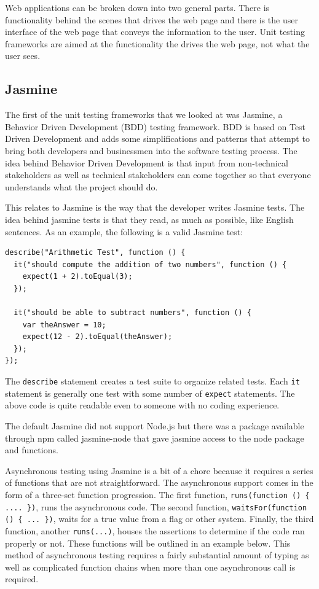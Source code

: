 \documentclass[12pt]{ucthesis}
\begin{document}
Web applications can be broken down into two general parts. There is functionality behind the scenes that drives the web page and there is the user interface of the web page that conveys the information to the user. Unit testing frameworks are aimed at the functionality the drives the web page, not what the user sees.

\subsection{Jasmine}
The first of the unit testing frameworks that we looked at was Jasmine\cite{Jasmine}, a Behavior Driven Development (BDD) testing framework. BDD is based on Test Driven Development and adds some simplifications and patterns that attempt to bring both developers and businessmen into the software testing process. The idea behind Behavior Driven Development is that input from non-technical stakeholders as well as technical stakeholders can come together so that everyone understands what the project should do.

This relates to Jasmine is the way that the developer writes Jasmine tests. The idea behind jasmine tests is that they read, as much as possible, like English sentences. As an example, the following is a valid Jasmine test:
\begin{lstlisting}
describe("Arithmetic Test", function () {
  it("should compute the addition of two numbers", function () {
    expect(1 + 2).toEqual(3);
  });

  it("should be able to subtract numbers", function () {
    var theAnswer = 10;
    expect(12 - 2).toEqual(theAnswer);
  });
});
\end{lstlisting}
The \lstinline{describe} statement creates a test suite to organize related tests. Each \lstinline{it} statement is generally one test with some number of \lstinline{expect} statements. The above code is quite readable even to someone with no coding experience.

The default Jasmine did not support Node.js but there was a package available through npm called jasmine-node\cite{JasmineNode} that gave jasmine access to the node package and functions. 

Asynchronous testing using Jasmine is a bit of a chore because it requires a series of functions that are not straightforward. The asynchronous support comes in the form of a three-set function progression. The first function, \lstinline!runs(function () { .... })!, runs the asynchronous code. The second function, \lstinline!waitsFor(function () { ... })!, waits for a true value from a flag or other system. Finally, the third function, another \lstinline{runs(...)}, houses the assertions to determine if the code ran properly or not. These functions will be outlined in an example below. This method of asynchronous testing requires a fairly substantial amount of typing as well as complicated function chains when more than one asynchronous call is required.
\end{document}
